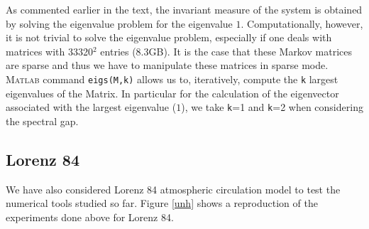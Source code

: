 As commented earlier in the text, the invariant measure of the system is obtained by solving the eigenvalue problem for the eigenvalue $1$. Computationally, however, it is not trivial to solve the eigenvalue problem, especially if one deals with matrices with 33320$^2$ entries (8.3GB). It is the case that these Markov matrices are sparse and thus we have to manipulate these matrices in sparse mode. \textsc{Matlab}\xspace command \texttt{eigs(M,k)} allows us to, iteratively, compute the \texttt{k} largest eigenvalues of the Matrix. In particular for the calculation of the eigenvector associated with the largest eigenvalue ($1$), we take \texttt{k}=1 and \texttt{k}=2 when considering the spectral gap.


\subsection{Lorenz 84}

We have also considered Lorenz 84 atmospheric circulation model to test the numerical tools studied so far. Figure \ref{unh} shows a reproduction of the experiments done above for Lorenz 84.

